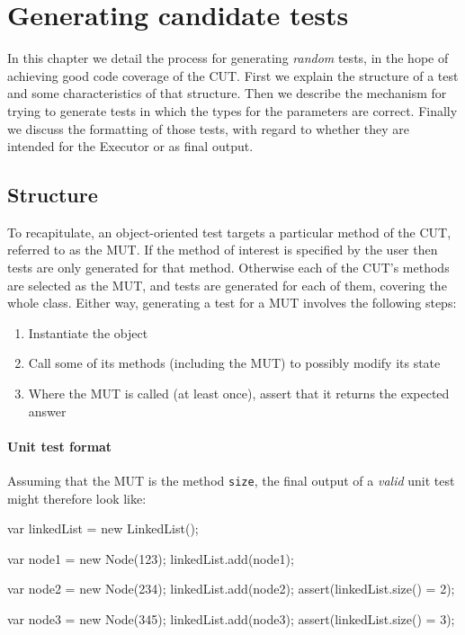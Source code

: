 \chapter{Generating candidate tests}
\label{randomtest}
In this chapter we detail the process for generating \emph{random} tests, in the hope of achieving good code coverage of the CUT. First we explain the structure of a test and some characteristics of that structure. Then we describe the mechanism for trying to generate tests in which the types for the parameters are correct. Finally we discuss the formatting of those tests, with regard to whether they are intended for the \textsf{Executor} or as final output.

\section{Structure}

To recapitulate, an object-oriented test targets a particular method of the CUT, referred to as the MUT. If the method of interest is specified by the user then tests are only generated for that method. Otherwise each of the CUT's methods are selected as the MUT, and tests are generated for each of them, covering the whole class. Either way, generating a test for a MUT involves the following steps:

\begin{enumerate}
	\item Instantiate the object
	\item Call some of its methods (including the MUT) to possibly modify its state
	\item Where the MUT is called (at least once), assert that it returns the expected answer
\end{enumerate}

\subsubsection{Unit test format}
Assuming that the MUT is the method \texttt{size}, the final output of a \emph{valid} unit test might therefore look like:

\begin{code}[caption=Unit test format,label=final]
var linkedList = new LinkedList();

var node1 = new Node(123);
linkedList.add(node1);

var node2 = new Node(234);
linkedList.add(node2);
assert(linkedList.size() = 2);

var node3 = new Node(345);
linkedList.add(node3);
assert(linkedList.size() = 3);
\end{code}

